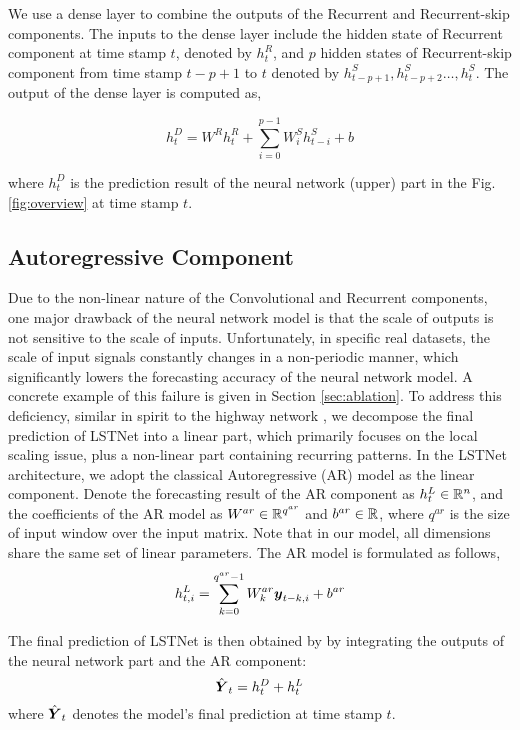 We use a dense layer to combine the outputs of the Recurrent and Recurrent-skip components. The inputs to the dense layer include the hidden state of Recurrent component at time stamp $t$, denoted by $h^R_t$, and $p$ hidden states of Recurrent-skip component from time stamp $t-p+1$ to $t$ denoted by $h^S_{t-p+1},h^S_{t-p+2} \ldots, h^S_{t}$. The output of the dense layer is computed as,

\begin{equation}
h^D_t = W^R h^R_t + \sum_{i=0}^{p-1} W^S_{i}h^S_{t-i} + b
\label{eq:dense}
\end{equation}

where $h^D_t$ is the prediction result of the neural network (upper) part in the Fig.\ref{fig:overview} at time stamp $t$.

\subsection{Autoregressive Component}
\label{sec:AR}
Due to the non-linear nature of the Convolutional and Recurrent components, one major drawback of the neural network model is that the scale of outputs is not sensitive to the scale of inputs. Unfortunately, in specific real datasets, the scale of input signals constantly changes in a non-periodic manner, which significantly lowers the forecasting accuracy of the neural network model. A concrete example of this failure is given in Section \ref{sec:ablation}. To address this deficiency, similar in spirit to the highway network \cite{srivastava2015highway}, we decompose the final prediction of LSTNet into a linear part, which primarily focuses on the local scaling issue, plus a non-linear part containing recurring patterns. In the LSTNet architecture, we adopt the classical Autoregressive (AR) model as the linear component. Denote the forecasting result of the AR component as $h^L_{t} \in {\mathbb{R}}^n$, and the coefficients of the AR model as $W^{ar} \in {\mathbb{R}}^{q^{ar}}$ and $b^{ar} \in {\mathbb{R}}$, where $q^{ar}$ is the size of input window over the input matrix. Note that in our model, all dimensions share the same set of linear parameters. The AR model is formulated as follows,
\begin{equation}
h^L_{t,i} = \sum_{k=0}^{q^{ar}-1}W^{ar}_k{\boldsymbol y}_{t-k,i} + b^{ar}
\end{equation}

The final prediction of LSTNet is then obtained by by integrating the outputs of the neural network part and the AR component:
\begin{equation}
\hat{{\boldsymbol Y}}_t = h^D_t + h^L_t
\end{equation}
where $\hat{{\boldsymbol Y}}_t$ denotes the model's final prediction at time stamp $t$.

